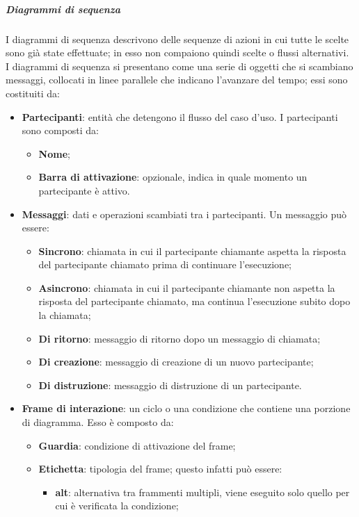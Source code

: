 \documentclass[../norme-di-progetto.tex]{subfiles}
\begin{document}
\subparagraph*{Diagrammi di sequenza}
I diagrammi di sequenza descrivono delle sequenze di azioni in cui tutte le scelte sono già state effettuate; in esso non compaiono quindi scelte o flussi alternativi. \\
I diagrammi di sequenza si presentano come una serie di oggetti che si scambiano messaggi, collocati in linee parallele che indicano l'avanzare del tempo; essi sono costituiti da:
\begin{itemize}
  \item \textbf{Partecipanti}: entità che detengono il flusso del caso d'uso. I partecipanti sono composti da:
  \begin{itemize}
    \item \textbf{Nome};
    \item \textbf{Barra di attivazione}: opzionale, indica in quale momento un partecipante è attivo.
  \end{itemize}
  \item \textbf{Messaggi}: dati e operazioni scambiati tra i partecipanti. Un messaggio può essere:
  \begin{itemize}
    \item \textbf{Sincrono}: chiamata in cui il partecipante chiamante aspetta la risposta del partecipante chiamato prima di continuare l'esecuzione;
    \item \textbf{Asincrono}: chiamata in cui il partecipante chiamante non aspetta la risposta del partecipante chiamato, ma continua l'esecuzione subito dopo la chiamata;
    \item \textbf{Di ritorno}: messaggio di ritorno dopo un messaggio di chiamata;
    \item \textbf{Di creazione}: messaggio di creazione di un nuovo partecipante;
    \item \textbf{Di distruzione}: messaggio di distruzione di un partecipante.
  \end{itemize}
  \item \textbf{Frame di interazione}: un ciclo o una condizione che contiene una porzione di diagramma. Esso è composto da:
  \begin{itemize}
    \item \textbf{Guardia}: condizione di attivazione del frame;
    \item \textbf{Etichetta}: tipologia del frame; questo infatti può essere:
    \begin{itemize}
      \item \textbf{alt}: alternativa tra frammenti multipli, viene eseguito solo quello per cui è verificata la condizione;

\end{itemize}
\end{itemize}
\end{itemize}
\end{document}

